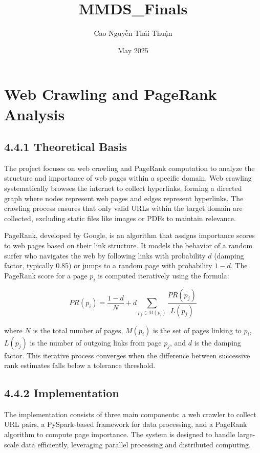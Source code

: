 \documentclass{article}
\title{MMDS_Finals}
\author{Cao Nguyễn Thái Thuận}
\date{May 2025}
\begin{document}
\maketitle

\section*{Web Crawling and PageRank Analysis}
\subsection*{4.4.1 Theoretical Basis}

The project focuses on web crawling and PageRank computation to analyze the structure and importance of web pages within a specific domain. Web crawling systematically browses the internet to collect hyperlinks, forming a directed graph where nodes represent web pages and edges represent hyperlinks. The crawling process ensures that only valid URLs within the target domain are collected, excluding static files like images or PDFs to maintain relevance.

PageRank, developed by Google, is an algorithm that assigns importance scores to web pages based on their link structure. It models the behavior of a random surfer who navigates the web by following links with probability \( d \) (damping factor, typically 0.85) or jumps to a random page with probability \( 1-d \). The PageRank score for a page \( p_i \) is computed iteratively using the formula:

\[
PR(p_i) = \frac{1-d}{N} + d \sum_{p_j \in M(p_i)} \frac{PR(p_j)}{L(p_j)}
\]

where \( N \) is the total number of pages, \( M(p_i) \) is the set of pages linking to \( p_i \), \( L(p_j) \) is the number of outgoing links from page \( p_j \), and \( d \) is the damping factor. This iterative process converges when the difference between successive rank estimates falls below a tolerance threshold.

\subsection*{4.4.2 Implementation}

The implementation consists of three main components: a web crawler to collect URL pairs, a PySpark-based framework for data processing, and a PageRank algorithm to compute page importance. The system is designed to handle large-scale data efficiently, leveraging parallel processing and distributed computing.
\end{document}
